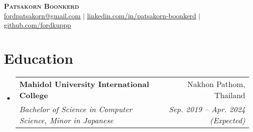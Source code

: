 \documentclass[letterpaper,11pt]{article}
\makeatletter
\newcommand{\resumeItem}[1]{
  \item\small{
    {#1 \vspace{-2pt}}
  }
}
\newcommand{\resumeSubheading}[4]{
  \vspace{-2pt}\item
    \begin{tabular*}{0.97\textwidth}[t]{l@{\extracolsep{\fill}}r}
      \textbf{#1} & #2 \\
      \textit{\small#3} & \textit{\small #4} \\
    \end{tabular*}\vspace{-7pt}
}
\newcommand{\resumeSubSubheading}[2]{
    \item
    \begin{tabular*}{0.97\textwidth}{l@{\extracolsep{\fill}}r}
      \textit{\small#1} & \textit{\small #2} \\
    \end{tabular*}\vspace{-7pt}
}
\newcommand{\resumeSubHeadingListStart}{\begin{itemize}[leftmargin=0.15in, label={}]}
\newcommand{\resumeSubHeadingListEnd}{\end{itemize}}
\newcommand{\resumeItemListStart}{\begin{itemize}}
\newcommand{\resumeItemListEnd}{\end{itemize}\vspace{-5pt}}
\makeatother
\begin{document}

\begin{center}
    \textbf{\Huge \scshape Patsakorn Boonkerd} \\ \vspace{1pt}
    \href{mailto:fordpatsakorn@gmail.com}{\underline{fordpatsakorn@gmail.com}} $|$ 
    \href{https://linkedin.com/in/patsakorn-boonkerd}{\underline{linkedin.com/in/patsakorn-boonkerd}} $|$
    \href{https://github.com/fordkuppp}{\underline{github.com/fordkuppp}}
\end{center}


\section{Education}
  \resumeSubHeadingListStart
    \resumeSubheading
      {Mahidol University International College}{Nakhon Pathom, Thailand}
      {Bachelor of Science in Computer Science, Minor in Japanese}{Sep. 2019 -- Apr. 2024 (Expected)}
  \resumeSubHeadingListEnd



      
\end{document}

